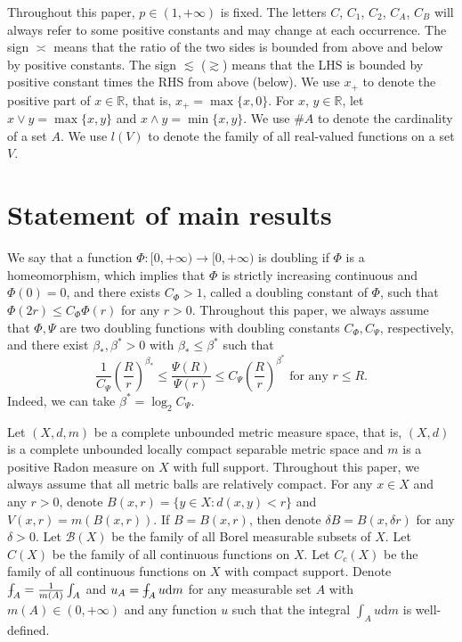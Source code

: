 \documentclass[11pt,a4paper]{article}
\numberwithin{equation}{section}
\def\Xint#1{\mathchoice
{\XXint\displaystyle\textstyle{#1}}%
{\XXint\textstyle\scriptstyle{#1}}%
{\XXint\scriptstyle\scriptscriptstyle{#1}}%
{\XXint\scriptscriptstyle\scriptscriptstyle{#1}}%
\!\int}
\def\XXint#1#2#3{{\setbox0=\hbox{$#1{#2#3}{\int}$ }
\vcenter{\hbox{$#2#3$ }}\kern-.6\wd0}}
\def\dashint{\Xint-}
\theoremstyle{plain}
\theoremstyle{definition}
\begin{document}
Throughout this paper, $p\in(1,+\infty)$ is fixed. The letters $C$, $C_1$, $C_2$, $C_A$, $C_B$ will always refer to some positive constants and may change at each occurrence. The sign $\asymp$ means that the ratio of the two sides is bounded from above and below by positive constants. The sign $\lesssim$ ($\gtrsim$) means that the LHS is bounded by positive constant times the RHS from above (below). We use $x_+$ to denote the positive part of $x\in\mathbb{R}$, that is, $x_+=\max\{x,0\}$. For $x$, $y\in \mathbb{R}$, let $x\vee y=\max\{x,y\}$ and $x\wedge y=\min\{x,y\}$. We use $\#A$ to denote the cardinality of a set $A$. We use $l(V)$ to denote the family of all real-valued functions on a set $V$.

\section{Statement of main results}

We say that a function $\Phi:[0,+\infty)\to[0,+\infty)$ is doubling if $\Phi$ is a homeomorphism, which implies that $\Phi$ is strictly increasing continuous and $\Phi(0)=0$, and there exists $C_\Phi>1$, called a doubling constant of $\Phi$, such that $\Phi(2r)\le C_\Phi\Phi(r)$ for any $r>0$. Throughout this paper, we always assume that $\Phi, \Psi$ are two doubling functions with doubling constants $C_\Phi, C_\Psi$, respectively, and there exist $\beta_*, \beta^*>0$ with $\beta_*\le\beta^*$ such that
$$\frac{1}{C_\Psi}\left(\frac{R}{r}\right)^{\beta_*}\le \frac{\Psi(R)}{\Psi(r)}\le C_{\Psi}\left(\frac{R}{r}\right)^{\beta^*}\text{ for any }r\le R.$$
Indeed, we can take $\beta^*=\log_2C_\Psi$.

Let $(X,d,m)$ be a complete unbounded metric measure space, that is, $(X,d)$ is a complete unbounded locally compact separable metric space and $m$ is a positive Radon measure on $X$ with full support. Throughout this paper, we always assume that all metric balls are relatively compact. For any $x\in X$ and any $r>0$, denote $B(x,r)=\{y\in X:d(x,y)<r\}$ and $V(x,r)=m(B(x,r))$. If $B=B(x,r)$, then denote $\delta B=B(x,\delta r)$ for any $\delta>0$. Let $\mathcal{B}(X)$ be the family of all Borel measurable subsets of $X$. Let $C(X)$ be the family of all continuous functions on $X$. Let $C_c(X)$ be the family of all continuous functions on $X$ with compact support. Denote $\dashint_A=\frac{1}{m(A)}\int_A$ and $u_A=\dashint_Au\mathrm{d} m$ for any measurable set $A$ with $m(A)\in(0,+\infty)$ and any function $u$ such that the integral $\int_Au\mathrm{d} m$ is well-defined.
\end{document}
